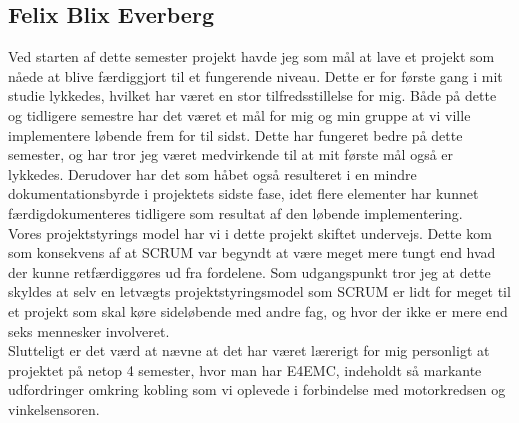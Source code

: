 \subsection*{Felix Blix Everberg}
Ved starten af dette semester projekt havde jeg som mål at lave et projekt som nåede at blive færdiggjort til et fungerende niveau. Dette er for første gang i mit studie lykkedes, hvilket har været en stor tilfredsstillelse for mig. Både på dette og tidligere semestre har det været et mål for mig og min gruppe at vi ville implementere løbende frem for til sidst. Dette har fungeret bedre på dette semester, og har tror jeg været medvirkende til at mit første mål også er lykkedes. Derudover har det som håbet også resulteret i en mindre dokumentationsbyrde i projektets sidste fase, idet flere elementer har kunnet færdigdokumenteres tidligere som resultat af den løbende implementering. \\
Vores projektstyrings model har vi i dette projekt skiftet undervejs. Dette kom som konsekvens af at SCRUM var begyndt at være meget mere tungt end hvad der kunne retfærdiggøres ud fra fordelene. Som udgangspunkt tror jeg at dette skyldes at selv en letvægts projektstyringsmodel som SCRUM er lidt for meget til et projekt som skal køre sideløbende med andre fag, og hvor der ikke er mere end seks mennesker involveret. \\
Slutteligt er det værd at nævne at det har været lærerigt for mig personligt at projektet på netop 4 semester, hvor man har E4EMC, indeholdt så markante udfordringer omkring kobling som vi oplevede i forbindelse med motorkredsen og vinkelsensoren. \\
